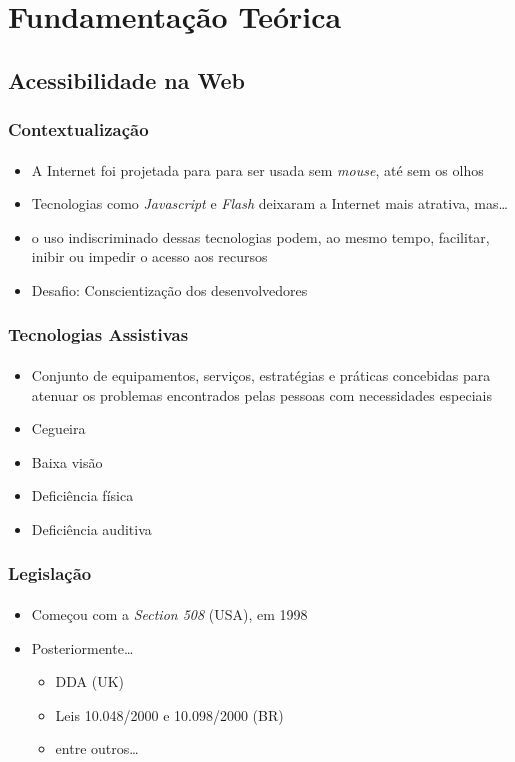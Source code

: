 \documentclass{beamer}
\begin{document}
\section{Fundamentação Teórica}
 
\subsection[Acessibilidade na Web]{Acessibilidade na Web}

\begin{frame}
\frametitle{Contextualização}
\framesubtitle{}

\begin{itemize}
 \item A Internet foi projetada para para ser usada sem \textit{mouse}, até sem os olhos \citep{thatcher:06}
 \item Tecnologias como \textit{Javascript} e \textit{Flash} deixaram a Internet mais atrativa, mas\ldots
 \pause
 \item o uso indiscriminado dessas tecnologias podem, ao mesmo tempo, facilitar, inibir ou impedir o acesso aos recursos
 \item Desafio: Conscientização dos desenvolvedores \citep{freire:08,alves:11}
\end{itemize}

\end{frame}

\begin{frame}
\frametitle{Tecnologias Assistivas}
\framesubtitle{}

\begin{itemize}
  \item Conjunto de equipamentos, serviços, estratégias e práticas concebidas para atenuar os problemas encontrados pelas pessoas com necessidades especiais \citep{cook:95}
  \item Cegueira
  \item Baixa visão
  \item Deficiência física
  \item Deficiência auditiva
\end{itemize}

\end{frame}

\begin{frame}
\frametitle{Legislação}
\framesubtitle{}

\begin{itemize}
  \item Começou com a \textit{Section 508} (USA), em 1998 \citep{section508:98}
\end{itemize}

\begin{itemize}
  \item Posteriormente\ldots
  \begin{itemize}
    \item DDA (UK) \citep{dda:95}
    \item Leis 10.048/2000 e 10.098/2000 (BR)
    \item entre outros\ldots
   \end{itemize}
\end{itemize}

\end{frame}
\end{document}
